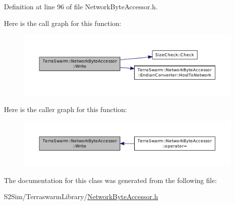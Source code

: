 Definition at line 96 of file Network\-Byte\-Accessor.\-h.



Here is the call graph for this function\-:\nopagebreak
\begin{figure}[H]
\begin{center}
\leavevmode
\includegraphics[width=350pt]{class_terra_swarm_1_1_network_byte_accessor_a7d6e11dd4a5f86e6c036bbcf64bccf25_cgraph}
\end{center}
\end{figure}




Here is the caller graph for this function\-:\nopagebreak
\begin{figure}[H]
\begin{center}
\leavevmode
\includegraphics[width=350pt]{class_terra_swarm_1_1_network_byte_accessor_a7d6e11dd4a5f86e6c036bbcf64bccf25_icgraph}
\end{center}
\end{figure}




The documentation for this class was generated from the following file\-:\begin{DoxyCompactItemize}
\item 
S2\-Sim/\-Terraswarm\-Library/\hyperlink{_network_byte_accessor_8h}{Network\-Byte\-Accessor.\-h}\end{DoxyCompactItemize}
